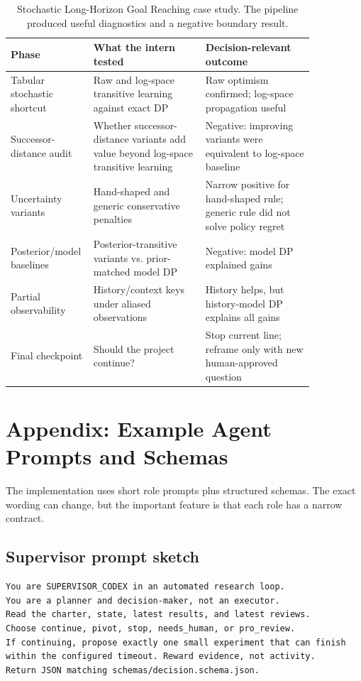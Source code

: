 \documentclass{article}
\begin{document}
\begin{table}[h]
\centering
\small
\begin{tabular}{p{0.16\linewidth}p{0.35\linewidth}p{0.34\linewidth}}
\toprule
Phase & What the intern tested & Decision-relevant outcome \\
\midrule
Tabular stochastic shortcut & Raw and log-space transitive learning against exact DP & Raw optimism confirmed; log-space propagation useful \\
Successor-distance audit & Whether successor-distance variants add value beyond log-space transitive learning & Negative: improving variants were equivalent to log-space baseline \\
Uncertainty variants & Hand-shaped and generic conservative penalties & Narrow positive for hand-shaped rule; generic rule did not solve policy regret \\
Posterior/model baselines & Posterior-transitive variants vs. prior-matched model DP & Negative: model DP explained gains \\
Partial observability & History/context keys under aliased observations & History helps, but history-model DP explains all gains \\
Final checkpoint & Should the project continue? & Stop current line; reframe only with new human-approved question \\
\bottomrule
\end{tabular}
\caption{Stochastic Long-Horizon Goal Reaching case study. The pipeline produced useful diagnostics and a negative boundary result.}
\end{table}

\section{Appendix: Example Agent Prompts and Schemas}

The implementation uses short role prompts plus structured schemas. The exact wording can change, but the important feature is that each role has a narrow contract.

\subsection{Supervisor prompt sketch}

\begin{verbatim}
You are SUPERVISOR_CODEX in an automated research loop.
You are a planner and decision-maker, not an executor.
Read the charter, state, latest results, and latest reviews.
Choose continue, pivot, stop, needs_human, or pro_review.
If continuing, propose exactly one small experiment that can finish
within the configured timeout. Reward evidence, not activity.
Return JSON matching schemas/decision.schema.json.
\end{verbatim}
\end{document}
